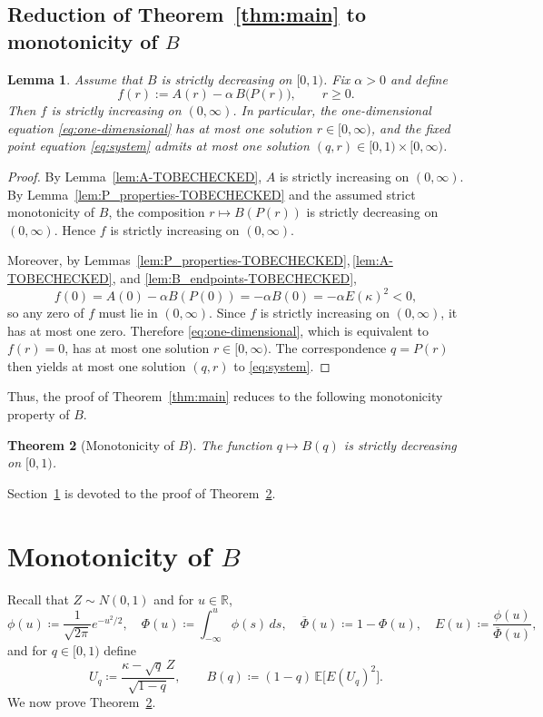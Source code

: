 \documentclass[11pt]{article}
\newtheorem{theorem}{Theorem}
\newtheorem{lemma}[theorem]{Lemma}
\begin{document}
\subsection{Reduction of Theorem~\ref{thm:main} to monotonicity of $B$} 
\begin{lemma}\label{lem:main_reduction-TOBECHECKED}
Assume that $B$ is strictly decreasing on $[0,1)$. Fix $\alpha>0$ and define
\[
f(r):=A(r)-\alpha\,B\bigl(P(r)\bigr),\qquad r\ge 0.
\]
Then $f$ is strictly increasing on $(0,\infty)$. In particular, the one-dimensional equation \eqref{eq:one-dimensional} has at most one solution $r\in[0,\infty)$, and the fixed point equation \eqref{eq:system} admits at most one solution $(q,r)\in[0,1)\times[0,\infty)$.
\end{lemma}
\begin{proof}
By Lemma~\ref{lem:A-TOBECHECKED}, $A$ is strictly increasing on $(0,\infty)$. By Lemma~\ref{lem:P_properties-TOBECHECKED} and the assumed strict monotonicity of $B$, the composition $r\mapsto B(P(r))$ is strictly decreasing on $(0,\infty)$. Hence $f$ is strictly increasing on $(0,\infty)$.

Moreover, by Lemmas~\ref{lem:P_properties-TOBECHECKED},\,\ref{lem:A-TOBECHECKED}, and \ref{lem:B_endpoints-TOBECHECKED},
\[
f(0)=A(0)-\alpha B(P(0))=-\alpha B(0)=-\alpha E(\kappa)^2<0,
\]
so any zero of $f$ must lie in $(0,\infty)$. Since $f$ is strictly increasing on $(0,\infty)$, it has at most one zero. Therefore \eqref{eq:one-dimensional}, which is equivalent to $f(r)=0$, has at most one solution $r\in[0,\infty)$. The correspondence $q=P(r)$ then yields at most one solution $(q,r)$ to \eqref{eq:system}.
\end{proof}

Thus, the proof of Theorem~\ref{thm:main} reduces to the following monotonicity property of $B$.
\begin{theorem}[Monotonicity of $B$]\label{thm:B_monotone}
The function $q\mapsto B(q)$ is strictly decreasing on $[0,1)$.
\end{theorem}
Section~\ref{section: monotone B} is devoted to the proof of Theorem~\ref{thm:B_monotone}.

\section{Monotonicity of $B$}\label{section: monotone B}
Recall that $Z\sim N(0,1)$ and for $u\in\mathbb{R}$,
\[
\phi(u) \coloneqq \frac{1}{\sqrt{2\pi}}e^{-u^{2}/2},\quad
\Phi(u)\coloneqq \int_{-\infty}^{u}\phi(s)\,ds,\quad
\overline{\Phi}(u)\coloneqq 1-\Phi(u),\quad 
E(u)\coloneqq \frac{\phi(u)}{\overline{\Phi}(u)},
\]
and for $q\in[0,1)$ define
\[
U_q\coloneqq \frac{\kappa-\sqrt{q}\,Z}{\sqrt{1-q}},\qquad
B(q)\coloneqq (1-q)\,\mathbb{E}\bigl[E(U_q)^2\bigr].
\]
We now prove Theorem~\ref{thm:B_monotone}.
\end{document}
